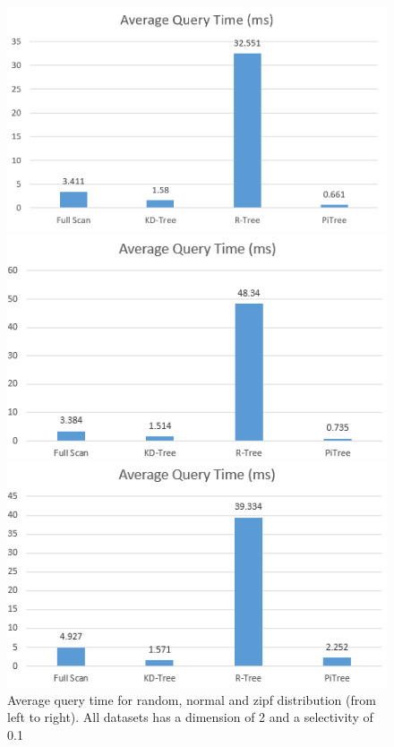 \documentclass[sigconf,10pt]{acmart}
\begin{document}
\begin{figure}[t] 
  \label{overall-performance-qtime} 
  \begin{minipage}[b]{0.33\linewidth}
    \centering
    \includegraphics[width=.8\linewidth]{../figures/overall-performance/random-qtime2} 
    \vspace{4ex}
  \end{minipage}%
  \begin{minipage}[b]{0.33\linewidth}
    \centering
    \includegraphics[width=.8\linewidth]{../figures/overall-performance/normal-qtime} 
    \vspace{4ex}
  \end{minipage}%
  \begin{minipage}[b]{0.33\linewidth}
    \centering
    \includegraphics[width=.8\linewidth]{../figures/overall-performance/zipf-qtime} 
    \vspace{4ex}
  \end{minipage}
  \caption{Average query time for random, normal and zipf distribution (from left to right). 
  All datasets has a dimension of 2 and a selectivity of 0.1}
\end{figure}
\end{document}
